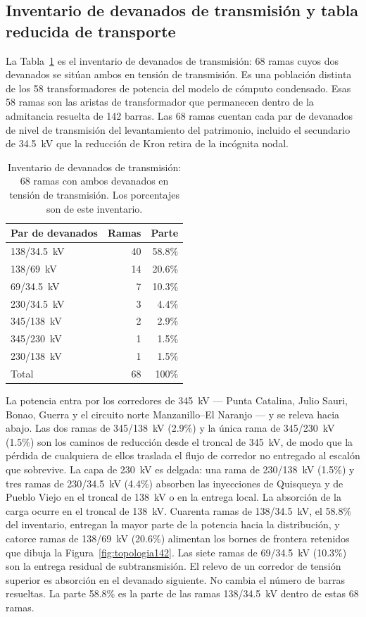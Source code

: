 \subsection{Inventario de devanados de transmisión y tabla reducida de transporte}
\label{sub:inventory}

La Tabla~\ref{tab:cuadro51} es el inventario de devanados de transmisión: 68 ramas cuyos dos devanados se sitúan ambos en tensión de transmisión. Es una población distinta de los 58 transformadores de potencia del modelo de cómputo condensado. Esas 58 ramas son las aristas de transformador que permanecen dentro de la admitancia resuelta de 142 barras. Las 68 ramas cuentan cada par de devanados de nivel de transmisión del levantamiento del patrimonio, incluido el secundario de 34.5~kV que la reducción de Kron retira de la incógnita nodal.

\begin{table}[!t]
\centering
\caption{Inventario de devanados de transmisión: 68 ramas con ambos devanados en tensión de transmisión. Los porcentajes son de este inventario.}
\label{tab:cuadro51}
\begin{tabular}{lrr}
\toprule
Par de devanados & Ramas & Parte \\
\midrule
138/34.5~kV & 40 & 58.8\% \\
138/69~kV & 14 & 20.6\% \\
69/34.5~kV & 7 & 10.3\% \\
230/34.5~kV & 3 & 4.4\% \\
345/138~kV & 2 & 2.9\% \\
345/230~kV & 1 & 1.5\% \\
230/138~kV & 1 & 1.5\% \\
\midrule
Total & 68 & 100\% \\
\bottomrule
\end{tabular}
\end{table}

La potencia entra por los corredores de 345~kV --- Punta Catalina, Julio Sauri, Bonao, Guerra y el circuito norte Manzanillo--El Naranjo --- y se releva hacia abajo. Las dos ramas de 345/138~kV (2.9\%) y la única rama de 345/230~kV (1.5\%) son los caminos de reducción desde el troncal de 345~kV, de modo que la pérdida de cualquiera de ellos traslada el flujo de corredor no entregado al escalón que sobrevive. La capa de 230~kV es delgada: una rama de 230/138~kV (1.5\%) y tres ramas de 230/34.5~kV (4.4\%) absorben las inyecciones de Quisqueya y de Pueblo Viejo en el troncal de 138~kV o en la entrega local. La absorción de la carga ocurre en el troncal de 138~kV. Cuarenta ramas de 138/34.5~kV, el 58.8\% del inventario, entregan la mayor parte de la potencia hacia la distribución, y catorce ramas de 138/69~kV (20.6\%) alimentan los bornes de frontera retenidos que dibuja la Figura~\ref{fig:topologia142}. Las siete ramas de 69/34.5~kV (10.3\%) son la entrega residual de subtransmisión. El relevo de un corredor de tensión superior es absorción en el devanado siguiente. No cambia el número de barras resueltas. La parte 58.8\% es la parte de las ramas 138/34.5~kV dentro de estas 68 ramas.

